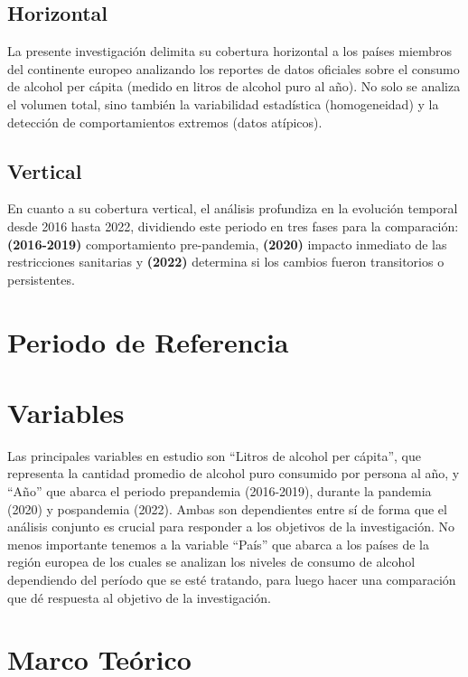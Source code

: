 \documentclass[
]{article}
\begin{document}
\subsection{Horizontal}

La presente investigación delimita su cobertura horizontal a los países
miembros del continente europeo analizando los reportes de datos
oficiales sobre el consumo de alcohol per cápita (medido en litros de
alcohol puro al año). No solo se analiza el volumen total, sino también
la variabilidad estadística (homogeneidad) y la detección de
comportamientos extremos (datos atípicos).

\subsection{Vertical}

En cuanto a su cobertura vertical, el análisis profundiza en la
evolución temporal desde 2016 hasta 2022, dividiendo este periodo en
tres fases para la comparación: \textbf{(2016-2019)} comportamiento
pre-pandemia, \textbf{(2020)} impacto inmediato de las restricciones
sanitarias y \textbf{(2022)} determina si los cambios fueron
transitorios o persistentes.

\section{Periodo de Referencia}

\section{Variables}

Las principales variables en estudio son ``Litros de alcohol per
cápita'', que representa la cantidad promedio de alcohol puro consumido
por persona al año, y ``Año'' que abarca el periodo prepandemia
(2016-2019), durante la pandemia (2020) y pospandemia (2022). Ambas son
dependientes entre sí de forma que el análisis conjunto es crucial para
responder a los objetivos de la investigación. No menos importante
tenemos a la variable ``País'' que abarca a los países de la región
europea de los cuales se analizan los niveles de consumo de alcohol
dependiendo del período que se esté tratando, para luego hacer una
comparación que dé respuesta al objetivo de la investigación.

\section{Marco Teórico}
\end{document}
